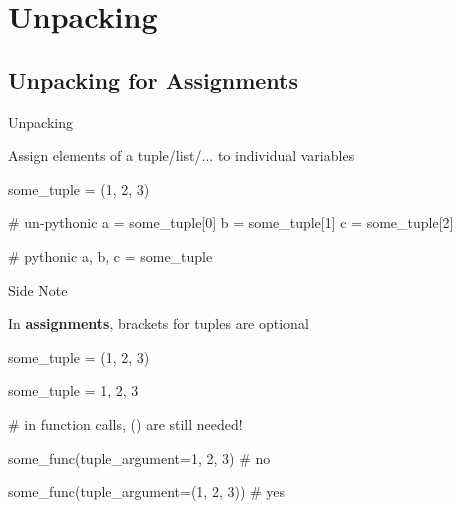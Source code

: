 \section{Unpacking}

\begin{frame}
    \sectionpage
\end{frame}

\subsection{Unpacking for Assignments}


\begin{frame}[fragile]{Unpacking}

    \begin{block}{}
        Assign elements of a tuple/list/... to individual variables
    \end{block}

    \begin{pythoncode}
    some_tuple = (1, 2, 3)

    # un-pythonic
    a = some_tuple[0]
    b = some_tuple[1]
    c = some_tuple[2]

    # pythonic
    a, b, c = some_tuple
    \end{pythoncode}


\end{frame}


\begin{frame}[fragile]{Side Note}

    \begin{block}{}
         In {\bf assignments}, brackets for tuples are optional
    \end{block}

    \begin{pythoncode}
    some_tuple = (1, 2, 3)

    some_tuple = 1, 2, 3

    # in function calls, () are still needed!

    some_func(tuple_argument=1, 2, 3)   # no

    some_func(tuple_argument=(1, 2, 3)) # yes
    \end{pythoncode}

\end{frame}

